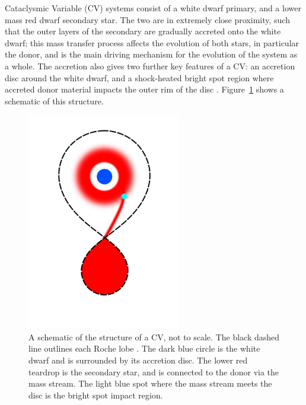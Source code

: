 
\label{chpt:introduction} %


Cataclysmic Variable (CV) systems consist of a white dwarf primary, and a lower mass red dwarf secondary star. The two are in extremely close proximity, such that the outer layers of the secondary are gradually accreted onto the white dwarf; this mass transfer process affects the evolution of both stars, in particular the donor, and is the main driving mechanism for the evolution of the system as a whole.
The accretion also gives two further key features of a CV: an accretion disc around the white dwarf, and a shock-heated bright spot region where accreted donor material impacts the outer rim of the disc \citep{warner1995,hellier2001}. Figure~\ref{fig:introduction:CV schematic} shows a schematic of this structure.

\begin{figure}
    \centering
    \includegraphics[width=0.6\textwidth]{figures/introduction/CV_schematic.png}
    \caption{A schematic of the structure of a CV, not to scale. The black dashed line outlines each Roche lobe . The dark blue circle is the white dwarf and is surrounded by its accretion disc. The lower red teardrop is the secondary star, and is connected to the donor via the mass stream. The light blue spot where the mass stream meets the disc is the bright spot impact region.}
    \label{fig:introduction:CV schematic}
\end{figure}

